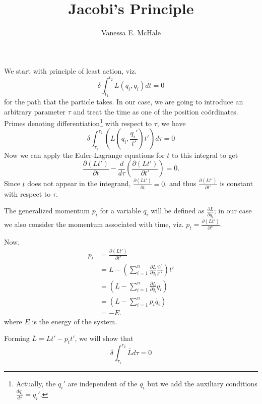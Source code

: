 \documentclass{article}
\begin{document}
\title{Jacobi's Principle}
\author{Vanessa E. McHale}
\date{}
\maketitle
We start with principle of least action, viz.
\begin{equation}
\delta\int_{t_1}^{t_2}L(q_i,\dot{q_i})dt=0
\end{equation}
for the path that the particle takes. In our case, we are going to introduce an arbitrary parameter $\tau$ and treat the time as one of the position co\"ordinates. Primes denoting differentiation\footnote{Actually, the $q_i'$ are independent of the $q_i$ but we add the auxiliary conditions $\frac{dq_i}{d\tau}=q_i'$.} with respect to $\tau$, we have
\begin{equation}
\delta\int_{\tau_1}^{\tau_2}\left(L\left(q_i,\frac{q_i'}{t'}\right)t'\right)d\tau=0
\end{equation}
Now we can apply the Euler-Lagrange equations for $t$ to this integral to get
\begin{equation}
\frac{\partial(Lt')}{\partial t}-\frac{d}{d\tau}\left(\frac{\partial(Lt')}{\partial t'}\right)=0.
\end{equation}
Since $t$ does not appear in the integrand, $\displaystyle\frac{\partial(Lt')}{\partial t}=0$, and thus $\displaystyle\frac{\partial(Lt')}{\partial t'}$ is constant with respect to $\tau$.

The generalized momentum $p_i$ for a variable $q_i$ will be defined as $\displaystyle\frac{\partial L}{\partial\dot{q_i}}$; in our case we also consider the momentum associated with time, viz. $\displaystyle p_t=\frac{\partial(Lt')}{\partial t'}$.

Now,
\begin{align*}
p_t&=\frac{\partial(Lt')}{\partial t'}\\
&=L-\left(\sum_{i=1}^n\frac{\partial L}{\partial\dot{q_i}}\frac{q_i'}{t'^2}\right)t'\\
&=\left(L-\sum_{i=1}^n\frac{\partial L}{\partial\dot{q_i}}\dot{q_i}\right)\\
&=\left(L-\sum_{i=1}^n p_i\dot{q_i}\right)\\
&=-E.
\end{align*}
where $E$ is the energy of the system.

Forming $\bar{L}=Lt'-p_tt'$, we will show that
\begin{equation}
\delta\int_{\tau_1}^{\tau_2}\bar{L}d\tau=0
\end{equation}
\end{document}
